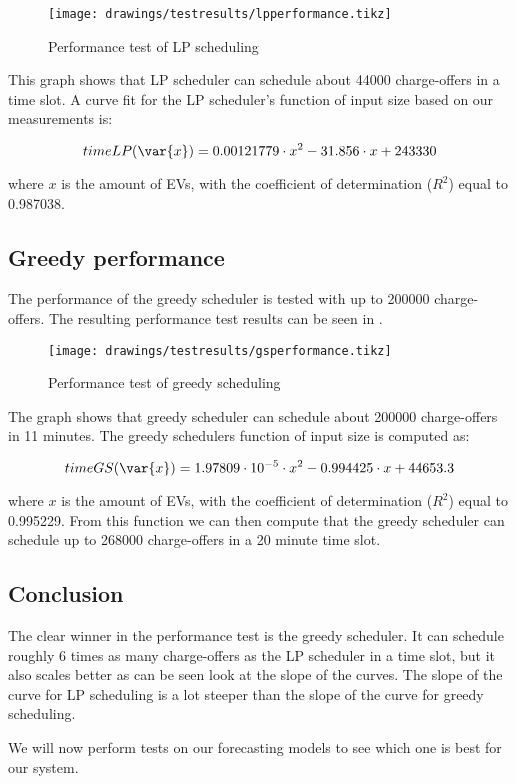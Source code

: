 \begin{figure}[!htb]
    \centering
    \texttt{[image: drawings/testresults/lpperformance.tikz]}
    \caption{Performance test of LP scheduling}\label{fig:performance_lp}
\end{figure}

This graph shows that LP scheduler can schedule about \num{44000} charge-offers in a time slot. A curve fit for the LP scheduler's function of input size based on our measurements is:

\[ \mathop{timeLP}(\var{x}) = 0.00121779 \cdot x^2 - 31.856 \cdot x + 243330 \]

where $x$ is the amount of EVs, with the coefficient of determination ($R^2$) equal to \num{0.987038}. 

\subsection{Greedy performance}\label{subsec:gsperformance} 
The performance of the greedy scheduler is tested with up to \num{200000} charge-offers. The resulting performance test results can be seen in .

\begin{figure}[!htb]
    \centering
    \texttt{[image: drawings/testresults/gsperformance.tikz]}
    \caption{Performance test of greedy scheduling}\label{fig:performance_gs}
\end{figure}

The graph shows that greedy scheduler can schedule about \num{200000} charge-offers in 11 minutes. The greedy schedulers function of input size is computed as:

\[ \mathop{timeGS}(\var{x}) = 1.97809 \cdot 10^{-5} \cdot x^2 - 0.994425 \cdot x + 44653.3 \]

where $x$ is the amount of EVs, with the coefficient of determination ($R^2$) equal to \num{0.995229}. From this function we can then compute that the greedy scheduler can schedule up to \num{268000} charge-offers in a 20 minute time slot.

\subsection{Conclusion}
The clear winner in the performance test is the greedy scheduler. It can schedule roughly 6 times as many charge-offers as the LP scheduler in a time slot, but it also scales better as can be seen look at the slope of the curves. The slope of the curve for LP scheduling is a lot steeper than the slope of the curve for greedy scheduling.

We will now perform tests on our forecasting models to see which one is best for our system. 

